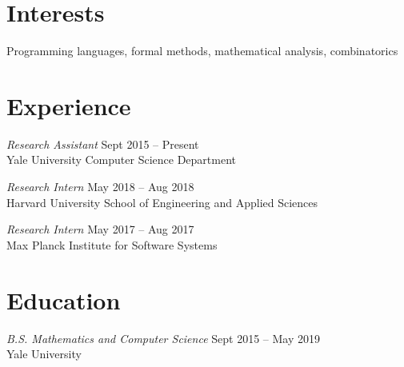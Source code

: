 \documentclass[margin]{res}
\begin{document}
 

 
\address{\textbf{Address} \\
         17 Broadway 2L \\
         New Haven, CT 06511}
 
\address{\textbf{Contact} \\
         \href{antonxue.github.io}{\texttt{antonxue.github.io}} \\
         \texttt{anton.xue@yale.edu}}

\begin{resume} 
 
\section{Interests} 
Programming languages,
formal methods,
mathematical analysis,
combinatorics


\section{Experience}
\textit{Research Assistant} \hfill Sept 2015 -- Present \\
Yale University Computer Science Department

\textit{Research Intern} \hfill May 2018 -- Aug 2018 \\
Harvard University School of Engineering and Applied Sciences

\textit{Research Intern} \hfill May 2017 -- Aug 2017 \\
Max Planck Institute for Software Systems

\section{Education} 
\textit{B.S. Mathematics and Computer Science}
  \hfill Sept 2015 -- May 2019 \\
Yale University




\end{resume}
\end{document}
